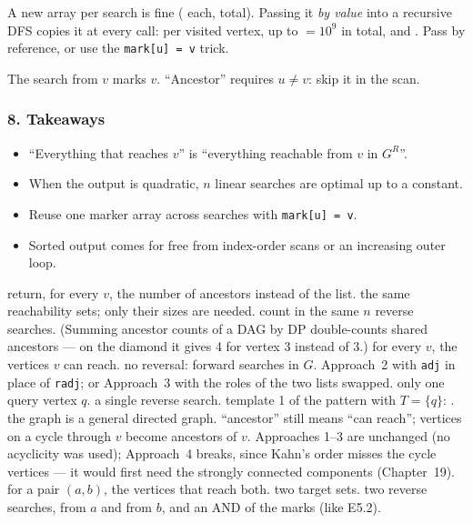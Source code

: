 \begin{warningbox}
A new array per search is fine ( each,  total). Passing it \emph{by value} into a recursive DFS copies it at every call:  per visited vertex, up to  $= 10^9$ in total, and \tle. Pass by reference, or use the \texttt{mark[u] = v} trick.
\end{warningbox}

\begin{warningbox}
The search from $v$ marks $v$. ``Ancestor'' requires $u \ne v$: skip it in the scan.
\end{warningbox}

\subsubsection*{8. Takeaways}

\begin{itemize}[leftmargin=*]
    \item ``Everything that reaches $v$'' is ``everything reachable from $v$ in $G^R$''.
    \item When the output is quadratic, $n$ linear searches are optimal up to a constant.
    \item Reuse one marker array across searches with \texttt{mark[u] = v}.
    \item Sorted output comes for free from index-order scans or an increasing outer loop.
\end{itemize}

\begin{variantsbox}
  {return, for every $v$, the number of ancestors instead of the list.}
  {the same reachability sets; only their sizes are needed.}
  {count in the same $n$ reverse searches. (Summing ancestor counts of a DAG by DP double-counts shared ancestors --- on the diamond it gives 4 for vertex 3 instead of 3.)}
  {for every $v$, the vertices $v$ can reach.}
  {no reversal: forward searches in $G$.}
  {Approach~2 with \texttt{adj} in place of \texttt{radj}; or Approach~3 with the roles of the two lists swapped.}
  {only one query vertex $q$.}
  {a single reverse search.}
  {template 1 of the pattern with $T = \{q\}$: \VE.}
  {the graph is a general directed graph.}
  {``ancestor'' still means ``can reach''; vertices on a cycle through $v$ become ancestors of $v$.}
  {Approaches 1--3 are unchanged (no acyclicity was used); Approach~4 breaks, since Kahn's order misses the cycle vertices --- it would first need the strongly connected components (Chapter~19).}
  {for a pair $(a, b)$, the vertices that reach both.}
  {two target sets.}
  {two reverse searches, from $a$ and from $b$, and an AND of the marks (like E5.2).}
\end{variantsbox}
